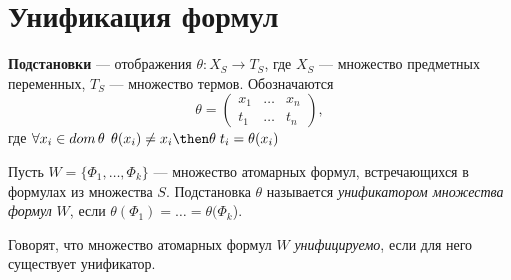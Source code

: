 \section{Унификация формул}
\dftion \textbf{Подстановки} --- отображения $\theta: X_S \to T_S$, где $X_S$ --- множество предметных переменных, $T_S$ --- множество термов. Обозначаются
$$\theta = \left(
\begin{matrix}
    x_1 & \dots & x_n \\
    t_1 & \dots & t_n
\end{matrix}
\right),$$
где $\forall x_i \in dom \, \theta \; \,  \theta(x_i) \neq x_i \then \theta \; t_i=\theta(x_i)$

Пусть $W=\{\Phi_1,\dots,\Phi_k\}$ --- множество атомарных формул, встречающихся в формулах из множества $S$. Подстановка $\theta$ называется \textit{унификатором множества формул} $W$, если $\theta(\Phi_1) = \dots = \theta(\Phi_k$).

Говорят, что множество атомарных формул $W$ \textit{унифицируемо}, если для него существует унификатор.